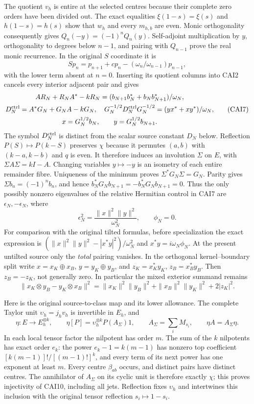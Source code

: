 The quotient $v_h$ is entire at the selected centres because their
complete zero orders have been divided out. The exact equalities
$\xi(1-s)=\xi(s)$ and $h(1-s)=h(s)$ show that $w_h$ and every $m_{h,b}$
are even. Monic orthogonality consequently gives $Q_n(-y)=(-1)^nQ_n(y)$.
Self-adjoint multiplication by $y$, orthogonality to degrees below
$n-1$, and pairing with $Q_{n-1}$ prove the real monic recurrence.
In the original $S$ coordinate it is
\[
 Sp_n=p_{n+1}+cp_n-(\omega_n/\omega_{n-1})p_{n-1},\tag{CAI6}
\]
with the lower term absent at $n=0$. Inserting its quotient columns into
CAI2 cancels every interior adjacent pair and gives
\[
\begin{gathered}
 AR_N+R_NA^*-kR_N=(b_{N+1}b_N^*+b_Nb_{N+1}^*)/\omega_N,\\
 D_N^{\rm ctrl}=A^*G_N+G_NA-kG_N,\quad
 G_N^{-1/2}D_N^{\rm ctrl}G_N^{-1/2}=(yx^*+xy^*)/\omega_N,\\
 x=G_N^{1/2}b_N,\qquad y=G_N^{1/2}b_{N+1}.
\end{gathered}\tag{CAI7}
\]
The symbol $D_N^{\rm ctrl}$ is distinct from the scalar source constant
$D_N$ below. Reflection $P(S)\mapsto P(k-S)$ preserves $\chi$ because
it permutes $(a,b)$ with $(k-a,k-b)$ and $q$ is even. It therefore induces
an involution $\Sigma$ on $E$, with $\Sigma A\Sigma=kI-A$.
Changing variables $y\mapsto-y$ is an isometry of each entire remainder
fibre. Uniqueness of the minimum proves $\Sigma^*G_N\Sigma=G_N$.
Parity gives $\Sigma b_n=(-1)^nb_n$, and hence
$b_N^*G_Nb_{N+1}=-b_N^*G_Nb_{N+1}=0$. Thus the only possibly nonzero
eigenvalues of the relative Hermitian control in CAI7 are
$\epsilon_N,-\epsilon_N$, where
\[
 \epsilon_N^2=\frac{\|x\|^2\|y\|^2}{\omega_N^2},\qquad
 \phi_N=0.\tag{CAI8}
\]
For comparison with the original tilted formulas, before specialization
the exact expression is
$(\|x\|^2\|y\|^2-|x^*y|^2)/\omega_N^2$ and
$x^*y=i\omega_N\phi_N$. At the present untilted source only the
\emph{total} pairing vanishes. In the orthogonal kernel--boundary split
write $x=x_K\oplus x_B$, $y=y_K\oplus y_B$, and
$z_K=x_K^*y_K$, $z_B=x_B^*y_B$. Then $z_B=-z_K$, not generally zero.
In particular the mixed exterior summand remains
\[
 \|x_K\otimes y_B-y_K\otimes x_B\|^2
 =\|x_K\|^2\|y_B\|^2+\|x_B\|^2\|y_K\|^2+2|z_K|^2.\tag{CAI9}
\]

Here is the original source-to-class map and its lower allowance. The
complete Taylor unit $\upsilon_h=j_hv_h$ is invertible in $E_h$, and
\[
 \eta:E\longrightarrow E_h^{\otimes k},\qquad
 \eta[P]=\upsilon_h^{\otimes k}P(A_\Sigma)1,\qquad
 A_\Sigma=\sum_iM_{s_i},\qquad \eta A=A_\Sigma\eta.\tag{CAI10}
\]
In each local tensor factor the nilpotent has order $m$. The sum of the
$k$ nilpotents has exact order $e_k$: the power $e_k-1=k(m-1)$ has
nonzero top coefficient $[k(m-1)]!/[(m-1)!]^k$, and every term of its
next power has one exponent at least $m$. Every centre $\beta_{ab}$
occurs, and distinct pairs have distinct centres. The annihilator of
$A_\Sigma$ on its cyclic unit is therefore exactly $\chi$; this proves
injectivity of CAI10, including all jets. Reflection fixes
$\upsilon_h$ and intertwines this inclusion with the original tensor
reflection $s_i\mapsto1-s_i$.

